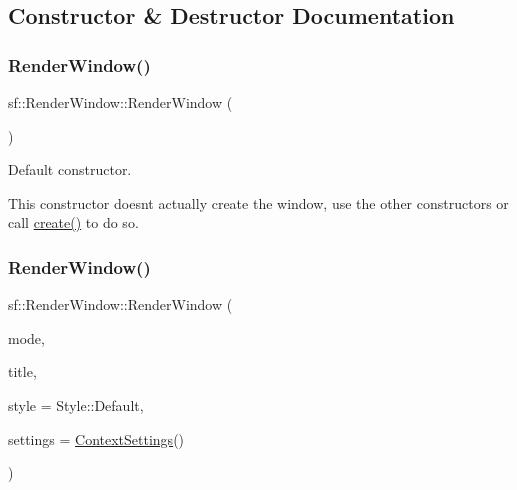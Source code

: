\subsection{Constructor \& Destructor Documentation}
\mbox{\label{classsf_1_1_render_window_a839bbf336bdcafb084dafc3076fc9021}} 
\subsubsection{\texorpdfstring{RenderWindow()}{RenderWindow()}\hspace{0.1cm}{\footnotesize\ttfamily [1/3]}}
{\footnotesize\ttfamily sf\+::\+Render\+Window\+::\+Render\+Window (\begin{DoxyParamCaption}{ }\end{DoxyParamCaption})}



Default constructor. 

This constructor doesn\textquotesingle{}t actually create the window, use the other constructors or call \mbox{\hyperlink{classsf_1_1_window_a30e6edf2162f8dbff61023b9de5d961d}{create()}} to do so. \begin{DoxyVerb}\end{DoxyVerb}
 \mbox{\label{classsf_1_1_render_window_aebef983e01f677bf5a66cefc4d547647}} 
\subsubsection{\texorpdfstring{RenderWindow()}{RenderWindow()}\hspace{0.1cm}{\footnotesize\ttfamily [2/3]}}
{\footnotesize\ttfamily sf\+::\+Render\+Window\+::\+Render\+Window (\begin{DoxyParamCaption}\item[{\mbox{\hyperlink{classsf_1_1_video_mode}{Video\+Mode}}}]{mode,  }\item[{const \mbox{\hyperlink{classsf_1_1_string}{String}} \&}]{title,  }\item[{Uint32}]{style = {\ttfamily Style\+:\+:Default},  }\item[{const \mbox{\hyperlink{structsf_1_1_context_settings}{Context\+Settings}} \&}]{settings = {\ttfamily \mbox{\hyperlink{structsf_1_1_context_settings}{Context\+Settings}}()} }\end{DoxyParamCaption})}



